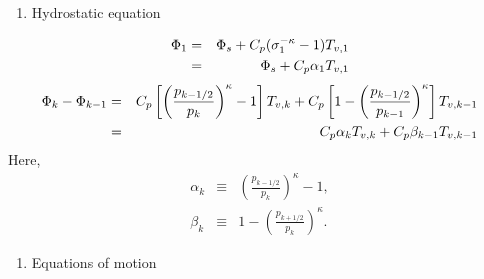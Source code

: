 \begin{enumerate}
\def\labelenumi{\arabic{enumi}.}
\tightlist
\item
  Hydrostatic equation
\end{enumerate}

\begin{eqnarray}
 \Phi_{1}  &=&  \Phi_{s} + C_{p} ( \sigma_{1}^{-\kappa} - 1  ) T_{v,1} \notag\\
           &=&  \Phi_{s} + C_{p} \alpha_{1} T_{v,1}  \end{eqnarray} \begin{eqnarray}
 \Phi_k - \Phi_{k-1}
  &=&  C_{p}
   \left[ \left( \frac{ p_{k-1/2} }{ p_k } \right)^{\kappa}
          - 1 \right] T_{v,k}
       + C_{p}
   \left[ 1-
         \left( \frac{ p_{k-1/2} }{ p_{k-1} } \right)^{\kappa}
              \right] T_{v,k-1} \notag\\
   &=&    C_{p} \alpha_k T_{v,k} + C_{p} \beta_{k-1} T_{v,k-1}  \end{eqnarray} Here, \begin{eqnarray}
 \alpha_k &\equiv & \left( \frac{ p_{k-1/2} }
                               { p_k } \right)^{\kappa} -1, \\
 \beta_k &\equiv &  1- \left( \frac{ p_{k+1/2} }
                               { p_k } \right)^{\kappa} .  \end{eqnarray}

\begin{enumerate}
\def\labelenumi{\arabic{enumi}.}
\tightlist
\item
  Equations of motion
\end{enumerate}


